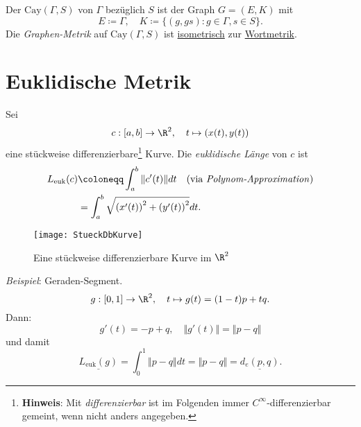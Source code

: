 \begin{definition}
  Der  \( \text{Cay}(\Gamma, S) \) von \( \Gamma \) bezüglich \( S \) ist der Graph \( G = (E, K) \) mit
  \begin{equation*}
    E \coloneqq \Gamma, \quad K \coloneqq \{ (g, gs) : g \in \Gamma, s \in S \}\text{.}
  \end{equation*}
  Die \emph{Graphen-Metrik} auf \( \text{Cay}(\Gamma, S) \) ist \hyperref[def:isometrie]{isometrisch} zur \hyperref[def:wortmetrik]{Wortmetrik}.
\end{definition}

\section{Euklidische Metrik}
\begin{example}
  Sei
  \begin{equation*}
    c : [a,b] \to \R^2, \quad t \mapsto (x(t), y(t))
  \end{equation*}
  eine stückweise differenzierbare\footnote{\textbf{Hinweis}: Mit \emph{differenzierbar} ist im Folgenden immer \( C^\infty \)-differenzierbar gemeint, wenn nicht anders angegeben.} Kurve.
  Die \emph{euklidische Länge} von \( c \) ist
  \begin{align*}
    L_{\text{euk}}(c) &\coloneqq \int_a^b \Vert c'(t) \Vert dt \quad \text{(via \emph{Polynom-Approximation})} \\
     &= \int_a^b \sqrt{{\left( x'(t) \right)}^2 + {\left( y'(t) \right)}^2}dt\text{.}
  \end{align*}
  \begin{figure}[H]
    \texttt{[image: StueckDbKurve]}
    \caption{Eine stückweise differenzierbare Kurve im \( \R^2 \)}
  \end{figure}
  \emph{Beispiel}: Geraden-Segment.
  \begin{equation*}
    g: [0,1] \to \R^2, \quad t \mapsto g(t) = (1-t)p + tq\text{.}
  \end{equation*}
  Dann:
  \begin{equation*}
    g'(t) = -p+q, \quad \Vert g'(t) \Vert = \Vert p - q \Vert
  \end{equation*}
  und damit
  \begin{equation*}
    \underline{L_{\text{euk}}(g)} = \int_0^1\Vert p - q \Vert dt = \Vert p - q \Vert = \underline{d_e(p,q)}\text{.}
  \end{equation*}
\end{example}

